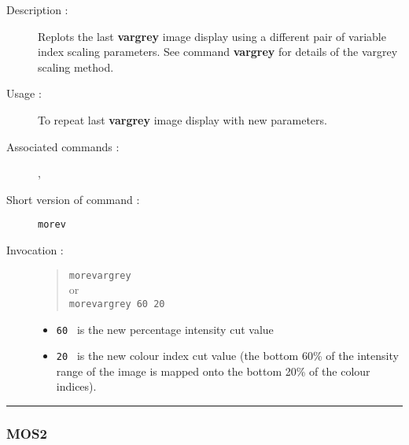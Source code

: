 \begin{description}

\item[Description :] Replots the last {\bf vargrey} image display using a
different pair of variable index scaling parameters.  See command
{\bf vargrey} for details of the vargrey scaling method.

\item[Usage :] To repeat last {\bf vargrey} image display with new parameters.
\item[Associated commands :] {\tt {}}, 
{\tt {}}
\item[Short version of command :] {\tt morev}
\item[Invocation :]

\begin{quote}{\tt  morevargrey }\\
or \\
{\tt morevargrey 60 20 }
\end{quote}

\begin{itemize}

\item {\tt 60 } is the new percentage intensity cut value

\item {\tt 20 } is the new colour index cut value 
(the bottom 60\% of the intensity range of the image  is
mapped onto the bottom 20\% of the colour indices).

\end{itemize}

\end{description}

\hrule 
\subsubsection*{\label{MOS2}MOS2}

